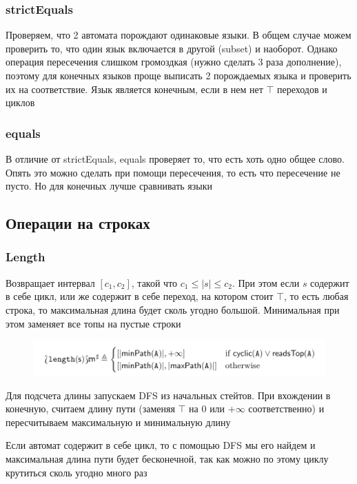 \subsubsection*{strictEquals}
Проверяем, что 2 автомата порождают одинаковые языки. В общем случае можем проверить то, что один язык включается в другой (subset) и наоборот. Однако операция пересечения слишком громоздкая (нужно сделать 3 раза дополнение), поэтому для конечных языков проще выписать 2 порождаемых языка и проверить их на соответствие. Язык является конечным, если в нем нет $\top$ переходов и циклов

\subsubsection*{equals}
В отличие от strictEquals, equals проверяет то, что есть хоть одно общее слово. Опять это можно сделать при помощи пересечения, то есть что пересечение не пусто. Но для конечных лучше сравнивать языки





\newpage
\subsection{Операции на строках}
\subsubsection*{Length}
Возвращает интервал $[c_1, c_2]$, такой что $c_1 \leq |s| \leq c_2$. При этом если $s$ содержит в себе цикл, или же содержит в себе переход, на котором стоит $\top$, то есть любая строка, то максимальная длина будет сколь угодно большой. Минимальная при этом заменяет все топы на пустые строки
\begin{figure}[H]
\includegraphics[width=\textwidth]{images/tarsis-length.png}\hfill
\end{figure}

Для подсчета длины запускаем DFS из начальных стейтов. При вхождении в конечную, считаем длину пути (заменяя $\top$ на $0$ или $+\infty$ соответственно) и пересчитываем максимальную и минимальную длину

Если автомат содержит в себе цикл, то с помощью DFS мы его найдем и максимальная длина пути будет бесконечной, так как можно по этому циклу крутиться сколь угодно много раз

